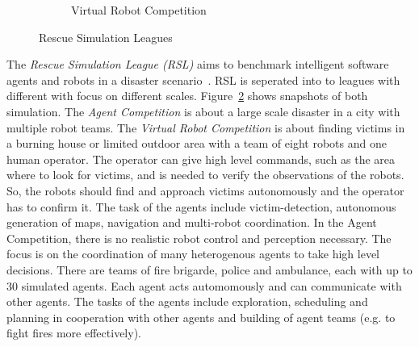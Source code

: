 \begin{figure}
\begin{subfigure}[b]{0.48\textwidth}
    \caption{Virtual Robot Competition~\cite{rescue_simulation_league}}
    \label{fig:rescue_vrc}
  \end{subfigure}
  \caption{Rescue Simulation Leagues}
  \label{fig:rescue}
\end{figure}
The \textit{Rescue Simulation League (RSL)} aims to benchmark intelligent software agents and robots in a disaster scenario~\cite{rescue_simulation_league}. RSL is seperated into to leagues with different with focus on different scales. Figure~\ref{fig:rescue} shows snapshots of both simulation. The \textit{Agent Competition} is about a large scale disaster in a city with multiple robot teams. The \textit{Virtual Robot Competition} is about finding victims in a burning house or limited outdoor area with a team of eight robots and one human operator. The operator can give high level commands, such as the area where to look for victims, and is needed to verify the observations of the robots. So, the robots should find and approach victims autonomously and the operator has to confirm it. The task of the agents include victim-detection, autonomous generation of maps, navigation and multi-robot coordination. In the Agent Competition, there is no realistic robot control and perception necessary. The focus is on the coordination of many heterogenous agents to take high level decisions. There are teams of fire brigarde, police and ambulance, each with up to 30 simulated agents. Each agent acts automomously and can communicate with other agents. The tasks of the agents include exploration, scheduling and planning in cooperation with other agents and building of agent teams (e.g. to fight fires more effectively).\\
